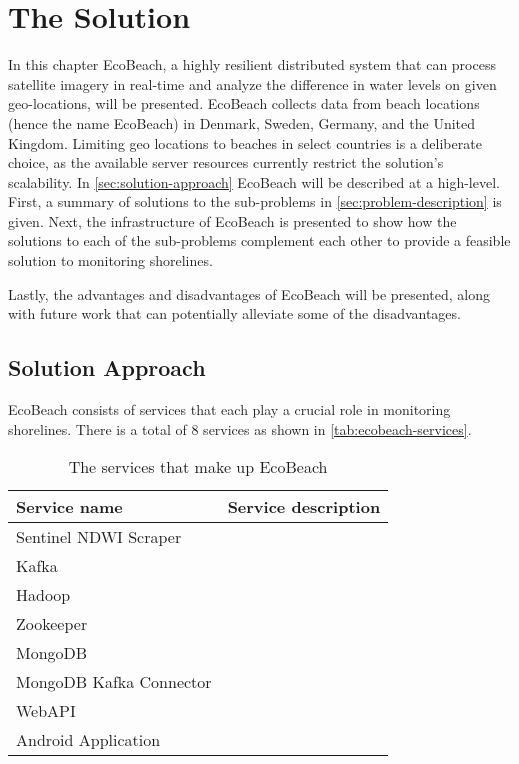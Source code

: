 \chapter{The Solution}

In this chapter EcoBeach, a highly resilient distributed system that can process satellite imagery in real-time and analyze the difference in water levels on given geo-locations, will be presented. 
EcoBeach collects data from beach locations (hence the name EcoBeach) in Denmark, Sweden, Germany, and the United Kingdom. Limiting geo locations to beaches in select countries is a deliberate choice, as the available server resources currently restrict the solution's scalability. \medbreak
\noindent
In \autoref{sec:solution-approach}  EcoBeach will be described at a high-level. First, a summary of solutions to the sub-problems in \autoref{sec:problem-description} is given. Next, the infrastructure of EcoBeach is presented to show how the solutions to each of the sub-problems complement each other to provide a feasible solution to monitoring shorelines.

Lastly, the advantages and disadvantages of EcoBeach will be presented, along with future work that can potentially alleviate some of the disadvantages.

\section{Solution Approach}\label{sec:solution-approach}

EcoBeach consists of services that each play a crucial role in monitoring shorelines. There is a total of 8 services as shown in \autoref{tab:ecobeach-services}.

\begin{table}[]
    \centering
    \begin{tabular}{|l|l|}
        \hline
        \textbf{Service name}   & \textbf{Service description} \\ \hline
        Sentinel NDWI Scraper   &                              \\\hline
        Kafka                   &                              \\\hline
        Hadoop                  &                              \\\hline
        Zookeeper               &                              \\\hline
        MongoDB                 &                              \\\hline
        MongoDB Kafka Connector &                              \\\hline
        WebAPI                  &                              \\\hline
        Android Application     &                              \\\hline
    \end{tabular}
    \caption{The services that make up EcoBeach}
    \label{tab:ecobeach-services}
\end{table}

